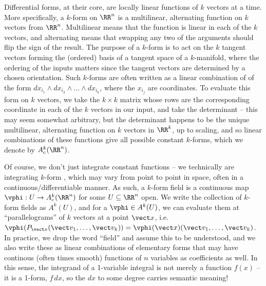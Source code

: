 \documentclass[12pt]{article}
\begin{document}
 \noindent  {} Differential forms, at
    their core, are locally linear functions of $k$ vectors at a time. More
    specifically, a $k$-form on $\RR^n$ is a multilinear, alternating function
    on $k$ vectors from $\RR^n$. Multilinear means that the function is linear
    in each of the $k$ vectors, and alternating means that swapping any two of
    the arguments should flip the sign of the result. The purpose of a
    $k$-form is to act on the $k$ tangent
    vectors forming the (ordered) basis of a tangent space of a $k$-manifold,
    where the ordering of the inputs matters since the tangent vectors are 
    determined by a chosen orientation. Such $k$-forms are often written as a 
    linear combination of  of
    the form $dx_{i_1} \wedge dx_{i_2} \wedge \dots \wedge dx_{i_k}$, where the
    $x_{i_j}$ are coordinates. To evaluate this form on $k$ vectors, we take the
    $k \times k$ matrix whose rows are the corresponding coordinate in each of
    the $k$ vectors in our input, and take the determinant -- this may seem somewhat
    arbitrary, but the determinant happens to be the unique multilinear, 
    alternating function on $k$ vectors in $\RR^k$, up to scaling, and so linear
    combinations of these functions give all possible constant $k$-forms, which 
    we denote by $A_c^k(\RR^n)$.
    
    Of course, we don't just integrate
    constant functions -- we technically are integrating $k$-form ,
    which may vary from point to point in space, often in a
    continuous/differentiable manner. As such, a $k$-form field is a continuous 
    map $\vphi : U \to A_c^k(\RR^n)$ for some $U \subseteq \RR^n$ open. We write 
    the collection of $k$-form fields as $A^k(U)$, and for a $\vphi \in A^k(U)$, 
    we can evaluate them at ``parallelograms'' of $k$ vectors at a point $\vect x$,
    i.e. $\vphi(P_{\vect x}(\vect v_1, \dots, \vect v_k)) = \vphi(\vect x)(\vect v_1, 
    \dots, \vect v_k)$. In practice, we drop the word ``field'' and assume this
    to be understood, and we also write these as linear combinations of elementary
    forms that may have continous (often times smooth) functions of $n$ variables
    as coefficients as well. In this sense, the integrand of a 1-variable integral 
    is not merely a function $f(x)$ -- it is a 1-form, $f \, dx$, so the $dx$ to 
    some degree carries semantic meaning!  
\end{document}
